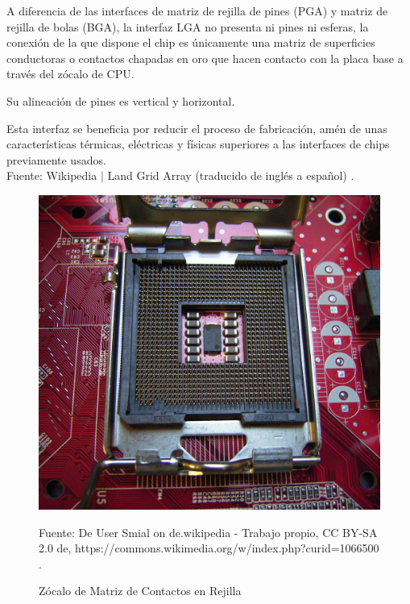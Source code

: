 \documentclass[conference]{IEEEtran}
\begin{document}
    \begin{displayquote}
        A diferencia de las interfaces de matriz de rejilla de pines (PGA) y
        matriz de rejilla de bolas (BGA), la interfaz LGA no presenta ni
        pines ni esferas, la conexión de la que dispone el chip es únicamente
        una matriz de superficies conductoras o contactos chapadas en oro que
        hacen contacto con la placa base a través del zócalo de CPU.

        \bigbreak

        Su alineación de pines es vertical y horizontal.

        \bigbreak

        Esta interfaz se beneficia por reducir el proceso de fabricación,
        amén de unas características térmicas, eléctricas y físicas
        superiores a las interfaces de chips previamente usados.\\
        \small
        Fuente: Wikipedia $\mid$ Land Grid Array (traducido de inglés a
        español) \cite{wikipedia-lga-2021D}.
    \end{displayquote}

    \begin{figure}[H]
        \centering
        \includegraphics[width=0.2\paperwidth]{images/lga-socket.jpg}
        \caption{Zócalo de Matriz de Contactos en Rejilla} \footnotesize
        Fuente: De User Smial on de.wikipedia - Trabajo propio, CC BY-SA 2.0
        de, https://commons.wikimedia.org/w/index.php?curid=1066500
        \cite{wikipedia-lga-2021D}.
    \end{figure}
\end{document}

